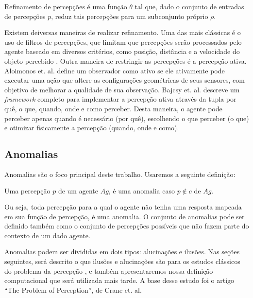 \begin{definition}
    \label{def:refinamento}
    Refinamento de percepções é uma função $\theta$ tal que, dado o conjunto de entradas de percepções $p$, reduz tais percepções para um subconjunto próprio $\rho$.
\end{definition}

Existem deiversas maneiras de realizar refinamento. Uma das mais clássicas é o uso de filtros de percepções, que limitam que percepções serão processados pelo agente baseado em diversos critérios, como posição, distância e a velocidade do objeto percebido \cite{bordeux2001}. Outra maneira de restringir as percepções é a percepção ativa. Aloimonos et. al. \cite{Aloimonos1988} define um observador como ativo se ele ativamente pode  executar uma ação que altere as configurações geométricas de seus sensores, com objetivo de melhorar a qualidade de sua observação. Bajcsy et. al. \cite{Bajcsy2018} descreve um \emph{framework} completo para implementar a percepção ativa através da tupla por quê, o que, quando, onde e como perceber. Desta maneira, o agente pode perceber apenas quando é necessário (por quê), escolhendo o que perceber (o que) e otimizar fisicamente a percepção (quando, onde e como).

\subsection{Anomalias}

Anomalias são o foco principal deste trabalho. Usaremos a seguinte definição:

\begin{definition}
    Uma percepção $p$ de um agente $Ag$, é uma anomalia caso $p \notin c$ de $Ag$.
\end{definition}

Ou seja, toda percepção para a qual o agente não tenha uma resposta mapeada em sua função de percepção, é uma anomalia. O conjunto de anomalias pode ser definido também como o conjunto de percepções possíveis que não fazem parte do contexto de um dado agente.

Anomalias podem ser divididas em dois tipos: alucinações e ilusões. Nas seções seguintes, será descrito o que ilusões e alucinações são para os estudos clássicos do problema da percepção \cite{Russell1912-RUSTPO-49} \cite{Price1933-PRIP-20}, e também apresentaremos nossa definição computacional que será utilizada mais tarde. A base desse estudo foi o artigo ``The Problem of Perception'', de Crane et. al. \cite{perception-problem}

